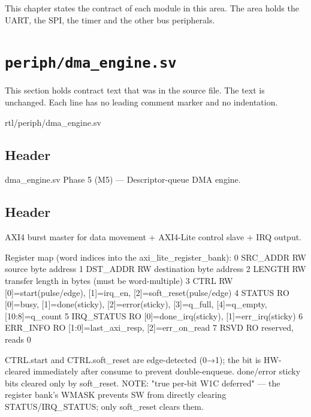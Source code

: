 This chapter states the contract of each module in this area. The area holds the UART, the SPI, the timer and the other bus peripherals.

\section{\texttt{periph/dma\_engine.sv}}\label{ds:mod:dma-engine}

This section holds contract text that was in the source file. The text is unchanged. Each line has no leading comment marker and no indentation.

\begin{relocated}{rtl/periph/dma_engine.sv}

\subsection*{Header}

\begin{textblock}
dma_engine.sv
Phase 5 (M5) — Descriptor-queue DMA engine.
\end{textblock}

\subsection*{Header}

\begin{textblock}
AXI4 burst master for data movement + AXI4-Lite control slave + IRQ output.

Register map (word indices into the axi_lite_register_bank):
  0  SRC_ADDR    RW  source byte address
  1  DST_ADDR    RW  destination byte address
  2  LENGTH      RW  transfer length in bytes (must be word-multiple)
  3  CTRL        RW  [0]=start(pulse/edge), [1]=irq_en, [2]=soft_reset(pulse/edge)
  4  STATUS      RO  [0]=busy, [1]=done(sticky), [2]=error(sticky),
                     [3]=q_full, [4]=q_empty, [10:8]=q_count
  5  IRQ_STATUS  RO  [0]=done_irq(sticky), [1]=err_irq(sticky)
  6  ERR_INFO    RO  [1:0]=last_axi_resp, [2]=err_on_read
  7  RSVD        RO  reserved, reads 0

CTRL.start and CTRL.soft_reset are edge-detected (0→1); the bit is
HW-cleared immediately after consume to prevent double-enqueue.
done/error sticky bits cleared only by soft_reset.
NOTE: "true per-bit W1C deferred" — the register bank's WMASK prevents SW
from directly clearing STATUS/IRQ_STATUS; only soft_reset clears them.


\end{textblock}
\end{relocated}
